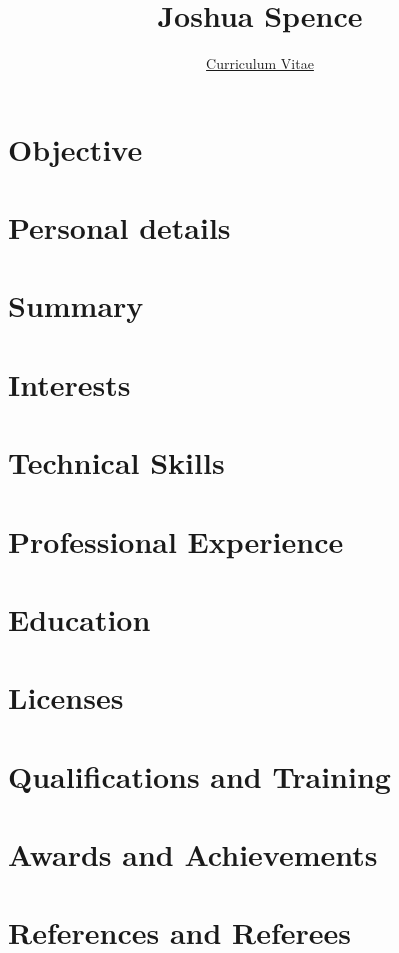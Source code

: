 \documentclass{article}
\title{\Huge{\textbf{Joshua Spence}}}
\author{\Large{\underline{Curriculum Vitae}}}
\date{}
\begin{document}
\maketitle

\section*{Objective}


\section*{Personal details}


\section*{Summary}


\section*{Interests}


\section*{Technical Skills}


\section*{Professional Experience}


\section*{Education}


\section*{Licenses}


\section*{Qualifications and Training}


\section*{Awards and Achievements}


\section*{References and Referees}

\end{document}
